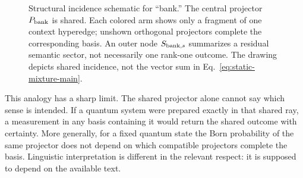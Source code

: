 \documentclass[
  aps,
  reprint,
  superscriptaddress,
  floatfix,
  nofootinbib,
  longbibliography
]{revtex4-2}
\begin{document}
\clearpage
\begin{figure}[t]
\centering
{}
\caption{Structural incidence schematic for ``bank.''  The central projector
$P_{\rm bank}$ is shared.  Each colored arm shows only a fragment of one
context hyperedge; unshown orthogonal projectors complete the corresponding
basis.  An outer node $S_{{\rm bank},s}$ summarizes a residual semantic sector,
not necessarily one rank-one outcome.  The drawing depicts shared incidence,
not the vector sum in Eq.~\eqref{eq:static-mixture-main}.}
\label{fig:contexts}
\end{figure}

This analogy has a sharp limit.  The shared projector alone cannot say which
sense is intended.  If a quantum system were prepared exactly in that shared
ray, a measurement in any basis containing it would return the shared outcome
with certainty.  More generally, for a fixed quantum state the Born
probability of the same projector does not depend on which compatible
projectors complete the basis.  Linguistic interpretation is different in the
relevant respect: it is supposed to depend on the available text.
\end{document}

